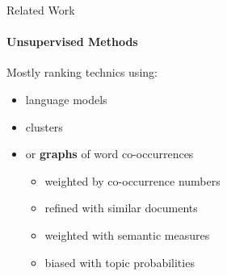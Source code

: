   \begin{frame}{Related Work}
    \framesubtitle{Unsupervised Methods}

    Mostly ranking technics using:
    \begin{itemize}
      \item{language models}%
      \item{clusters}%
      \item{or \textbf{graphs} of word
            co-occurrences}%
      \begin{itemize}
        \item<2->{weighted by co-occurrence numbers}%
        \item<2->{refined with similar documents}%
        \item<2->{weighted with semantic
                  measures}%
        \item<2->{biased with topic probabilities}%
      \end{itemize}
    \end{itemize}
  \end{frame}

